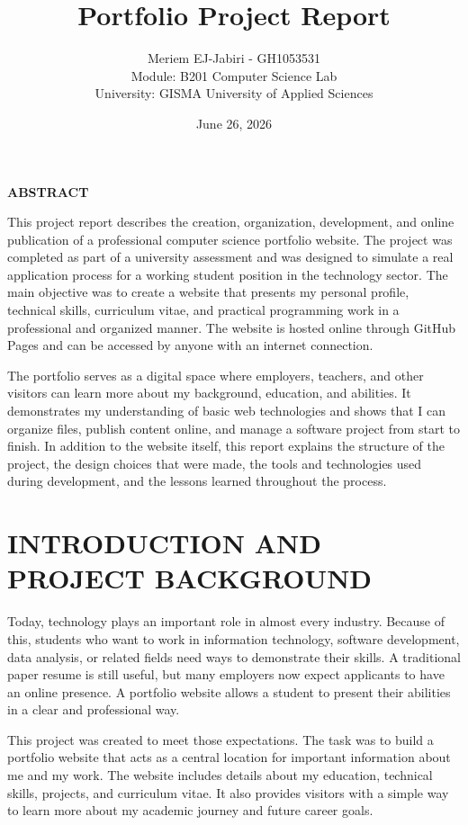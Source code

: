 \documentclass[12pt]{article}
\title{Portfolio Project Report}
\author{Meriem EJ-Jabiri - GH1053531 \\ Module: B201 Computer Science Lab \\ University: GISMA University of Applied Sciences}
\date{June 26, 2026}
\begin{document}
\maketitle

\begin{center}
\textbf{ABSTRACT}
\end{center}
This project report describes the creation, organization, development, and online publication of a professional computer science portfolio website. The project was completed as part of a university assessment and was designed to simulate a real application process for a working student position in the technology sector. The main objective was to create a website that presents my personal profile, technical skills, curriculum vitae, and practical programming work in a professional and organized manner. The website is hosted online through GitHub Pages and can be accessed by anyone with an internet connection.

The portfolio serves as a digital space where employers, teachers, and other visitors can learn more about my background, education, and abilities. It demonstrates my understanding of basic web technologies and shows that I can organize files, publish content online, and manage a software project from start to finish. In addition to the website itself, this report explains the structure of the project, the design choices that were made, the tools and technologies used during development, and the lessons learned throughout the process.

\newpage

\section*{INTRODUCTION AND PROJECT BACKGROUND}
Today, technology plays an important role in almost every industry. Because of this, students who want to work in information technology, software development, data analysis, or related fields need ways to demonstrate their skills. A traditional paper resume is still useful, but many employers now expect applicants to have an online presence. A portfolio website allows a student to present their abilities in a clear and professional way.

This project was created to meet those expectations. The task was to build a portfolio website that acts as a central location for important information about me and my work. The website includes details about my education, technical skills, projects, and curriculum vitae. It also provides visitors with a simple way to learn more about my academic journey and future career goals.
\end{document}
